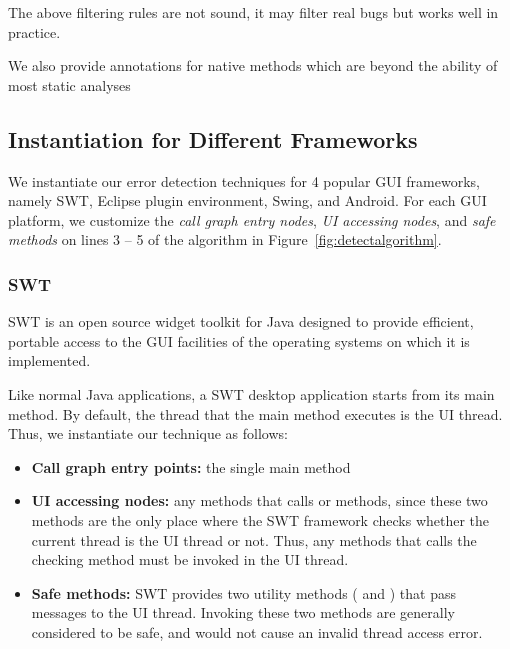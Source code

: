 The above filtering rules are not sound, it may filter real bugs but works
well in practice.

We also provide annotations for native methods which are beyond the ability
of most static analyses

\subsection{Instantiation for Different Frameworks}
\label{sec:platforms}

We instantiate our error detection techniques for 4 popular GUI frameworks,
namely SWT, Eclipse plugin environment, Swing, and Android.
For each GUI platform, we customize the \textit{call graph entry nodes},
\textit{UI accessing nodes}, and \textit{safe methods} on lines 3 -- 5 of the
algorithm in Figure~\ref{fig:detectalgorithm}.




\subsubsection{SWT}

SWT is an open source widget toolkit for Java designed to provide efficient,
portable access to the GUI facilities of the operating systems on which it is implemented.

Like normal Java applications, a SWT desktop application starts from its main method.
By default, the thread that the main method executes is the UI thread. Thus, we instantiate
our technique as follows:

\begin{itemize}

\item \textbf{Call graph entry points: } the single main method

\item \textbf{UI accessing nodes: } any methods that calls 
or  methods, since these two methods are the
only place where the SWT framework checks whether the current thread is the UI thread or not. Thus, any
methods that calls the checking method must be invoked in the UI thread.

\item \textbf{Safe methods: } SWT provides two utility methods (
and ) that pass messages to the UI thread.
 Invoking these two methods are generally considered to be safe, and would not
cause an invalid thread access error.

\end{itemize}

